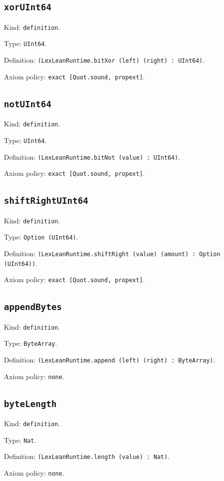 \documentclass[11pt]{article}
\begin{document}
\subsection*{\texttt{xorUInt64}}
\noindent Kind: \texttt{definition}.\par
\noindent Type: \texttt{UInt64}.\par
\noindent Definition: \texttt{(LexLeanRuntime.bitXor (left) (right) : UInt64)}.\par
\noindent Axiom policy: \texttt{exact [Quot.sound, propext]}.\par
\subsection*{\texttt{notUInt64}}
\noindent Kind: \texttt{definition}.\par
\noindent Type: \texttt{UInt64}.\par
\noindent Definition: \texttt{(LexLeanRuntime.bitNot (value) : UInt64)}.\par
\noindent Axiom policy: \texttt{exact [Quot.sound, propext]}.\par
\subsection*{\texttt{shiftRightUInt64}}
\noindent Kind: \texttt{definition}.\par
\noindent Type: \texttt{Option (UInt64)}.\par
\noindent Definition: \texttt{(LexLeanRuntime.shiftRight (value) (amount) : Option (UInt64))}.\par
\noindent Axiom policy: \texttt{exact [Quot.sound, propext]}.\par
\subsection*{\texttt{appendBytes}}
\noindent Kind: \texttt{definition}.\par
\noindent Type: \texttt{ByteArray}.\par
\noindent Definition: \texttt{(LexLeanRuntime.append (left) (right) : ByteArray)}.\par
\noindent Axiom policy: \texttt{none}.\par
\subsection*{\texttt{byteLength}}
\noindent Kind: \texttt{definition}.\par
\noindent Type: \texttt{Nat}.\par
\noindent Definition: \texttt{(LexLeanRuntime.length (value) : Nat)}.\par
\noindent Axiom policy: \texttt{none}.\par
\end{document}

